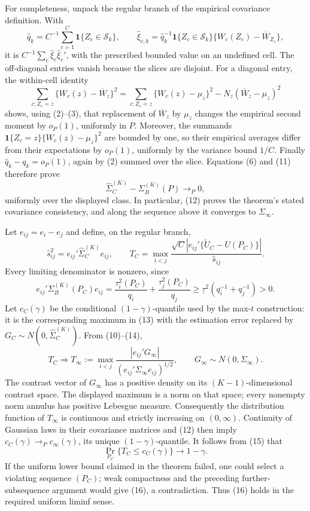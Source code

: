 For completeness, unpack the regular branch of the empirical covariance definition.  With
\[
\widehat q_k=C^{-1}\sum_{c=1}^C\mathbf 1\{Z_c\in\mathcal S_k\},
\qquad
\widehat\xi_{c,k}=\widehat q_k^{-1}\mathbf 1\{Z_c\in\mathcal S_k\}
\{W_c(Z_c)-\overline W_{Z_c}\},
\]
it is \(C^{-1}\sum_c\widehat\xi_c\widehat\xi_c'\), with the prescribed bounded value on an undefined cell.  The off-diagonal entries vanish because the slices are disjoint.  For a diagonal entry, the within-cell identity
\[
\sum_{c:Z_c=z}\{W_c(z)-\overline W_z\}^2
=\sum_{c:Z_c=z}\{W_c(z)-\mu_z\}^2
-N_z(\overline W_z-\mu_z)^2 \tag{11}
\]
shows, using (2)--(3), that replacement of \(\overline W_z\) by \(\mu_z\) changes the empirical second moment by \(o_P(1)\), uniformly in \(P\).  Moreover, the summands
\(\mathbf 1\{Z_c=z\}\{W_c(z)-\mu_z\}^2\) are bounded by one, so their empirical averages differ from their expectations by \(o_P(1)\), uniformly by the variance bound \(1/C\).  Finally \(\widehat q_k-q_k=o_P(1)\), again by (2) summed over the slice.  Equations (6) and (11) therefore prove
\[
\widehat\Sigma_C^{(K)}-\Sigma_B^{(K)}(P)\longrightarrow_P0, \tag{12}
\]
uniformly over the displayed class.  In particular, (12) proves the theorem's stated covariance consistency, and along the sequence above it converges to \(\Sigma_\infty\).

Let \(e_{ij}=e_i-e_j\) and define, on the regular branch,
\[
\widehat s_{ij}^2=e_{ij}'\widehat\Sigma_C^{(K)}e_{ij},
\qquad
T_C=\max_{i<j}
\frac{\sqrt C\left|e_{ij}'\{\widetilde U_C-U(P_C)\}\right|}{\widehat s_{ij}}. \tag{13}
\]
Every limiting denominator is nonzero, since
\[
e_{ij}'\Sigma_B^{(K)}(P_C)e_{ij}
=\frac{\tau_i^2(P_C)}{q_i}+\frac{\tau_j^2(P_C)}{q_j}
\geq\underline\tau^2\left(q_i^{-1}+q_j^{-1}\right)>0. \tag{14}
\]
Let \(c_C(\gamma)\) be the conditional \((1-\gamma)\)-quantile used by the max-\(t\) construction: it is the corresponding maximum in (13) with the estimation error replaced by \(G_C\sim N(0,\widehat\Sigma_C^{(K)})\).  From (10)--(14),
\[
T_C\Rightarrow
T_\infty:=\max_{i<j}
\frac{|e_{ij}'G_\infty|}{(e_{ij}'\Sigma_\infty e_{ij})^{1/2}},
\qquad G_\infty\sim N(0,\Sigma_\infty). \tag{15}
\]
The contrast vector of \(G_\infty\) has a positive density on its \((K-1)\)-dimensional contrast space.  The displayed maximum is a norm on that space; every nonempty norm annulus has positive Lebesgue measure.  Consequently the distribution function of \(T_\infty\) is continuous and strictly increasing on \((0,\infty)\).  Continuity of Gaussian laws in their covariance matrices and (12) then imply
\(c_C(\gamma)\to_Pc_\infty(\gamma)\), its unique \((1-\gamma)\)-quantile.  It follows from (15) that
\[
\Pr_{P_C}\{T_C\leq c_C(\gamma)\}\longrightarrow1-\gamma. \tag{16}
\]
If the uniform lower bound claimed in the theorem failed, one could select a violating sequence \((P_C)\); weak compactness and the preceding further-subsequence argument would give (16), a contradiction.  Thus (16) holds in the required uniform liminf sense.

